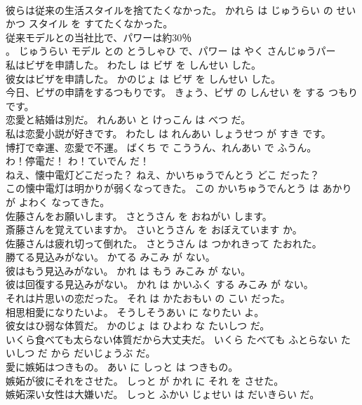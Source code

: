 \documentclass[8pt]{extreport}
\begin{document}
\begin{CJK}{UTF8}{min}
\\	彼らは従来の生活スタイルを捨てたくなかった。	かれら は じゅうらい の せいかつ スタイル を すてたくなかった。	
\\	従来モデルとの当社比で、パワーは約30％
\\	。	じゅうらい モデル との とうしゃひ で、パワー は やく さんじゅうパー 
\\	私はビザを申請した。	わたし は ビザ を しんせい した。	
\\	彼女はビザを申請した。	かのじょ は ビザ を しんせい した。	
\\	今日、ビザの申請をするつもりです。	きょう、ビザ の しんせい を する つもり です。	
\\	恋愛と結婚は別だ。	れんあい と けっこん は べつ だ。	
\\	私は恋愛小説が好きです。	わたし は れんあい しょうせつ が すき です。	
\\	博打で幸運、恋愛で不運。	ばくち で こううん、れんあい で ふうん。	
\\	わ！停電だ！	わ！ていでん だ！	
\\	ねえ、懐中電灯どこだった？	ねえ、かいちゅうでんとう どこ だった？	
\\	この懐中電灯は明かりが弱くなってきた。	この かいちゅうでんとう は あかり が よわく なってきた。	
\\	佐藤さんをお願いします。	さとうさん を おねがい します。	
\\	斎藤さんを覚えていますか。	さいとうさん を おぼえています か。	
\\	佐藤さんは疲れ切って倒れた。	さとうさん は つかれきって たおれた。	
\\	勝てる見込みがない。	かてる みこみ が ない。	
\\	彼はもう見込みがない。	かれ は もう みこみ が ない。	
\\	彼は回復する見込みがない。	かれ は かいふく する みこみ が ない。	
\\	それは片思いの恋だった。	それ は かたおもい の こい だった。	
\\	相思相愛になりたいよ。	そうしそうあい に なりたい よ。	
\\	彼女はひ弱な体質だ。	かのじょ は ひよわ な たいしつ だ。	
\\	いくら食べても太らない体質だから大丈夫だ。	いくら たべても ふとらない たいしつ だ から だいじょうぶ だ。	
\\	愛に嫉妬はつきもの。	あい に しっと は つきもの。	
\\	嫉妬が彼にそれをさせた。	しっと が かれ に それ を させた。	
\\	嫉妬深い女性は大嫌いだ。	しっと ふかい じょせい は だいきらい だ。	

\end{CJK}
\end{document}
